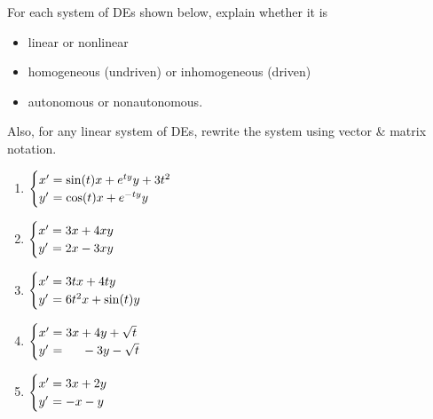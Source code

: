 \documentclass[12pt,letterpaper]{hmcpset}
\begin{document}

\begin{problem}[1]
    For each system of DEs shown below, explain whether it is
    \begin{itemize}
        \item linear or nonlinear
        \item homogeneous (undriven) or inhomogeneous (driven)
        \item autonomous or nonautonomous.
    \end{itemize}
    Also, for any linear system of DEs, rewrite the system using
    vector \& matrix notation.
    \begin{enumerate}
        \item $\begin{cases}
            x'&\hspace{-.1in}=\sin(t)x+e^{ty}y+3t^2\\
            y'&\hspace{-.1in}=\cos(t)x+e^{-ty}y
            \end{cases}$
        \item $\begin{cases}
            x'&\hspace{-.1in}=3x+4xy\\
            y'&\hspace{-.1in}=2x-3xy
            \end{cases}$
        \item $\begin{cases}
            x'&\hspace{-.1in}=3tx+4ty\\
            y'&\hspace{-.1in}=6t^2x+\sin(t)y
            \end{cases}$
        \item $\begin{cases}
            x'&\hspace{-.1in}=3x+4y+\sqrt{t}\\
            y'&\hspace{-.1in}=\mbox{\hspace{4.5mm}}-3y-\sqrt{t}
            \end{cases}$
        \item $\begin{cases}
            x'&\hspace{-.1in}=3x+2y\\
            y'&\hspace{-.1in}=-x-y
            \end{cases}$
    \end{enumerate}
\end{problem}
\newpage
\begin{solution}
    \null\vfill
\end{solution}
\newpage
\end{document}
